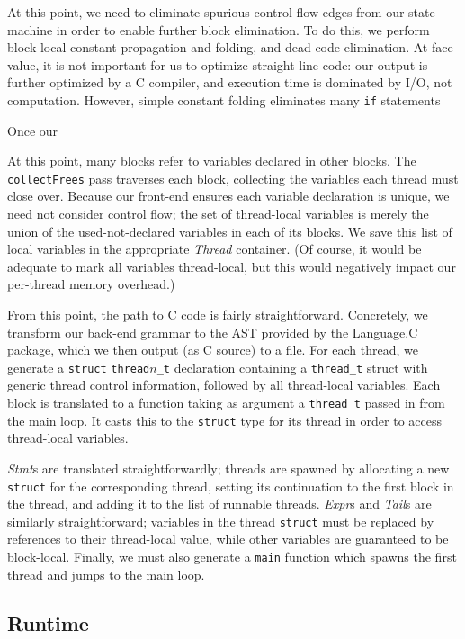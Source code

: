 \documentclass[preprint]{sigplanconf}
\renewcommand{\t}{\texttt}
\renewcommand{\i}{\textit}
\begin{document}
At this point, we need to eliminate spurious control flow edges from our state
machine in order to enable further block elimination. To do this, we perform
block-local constant propagation and folding, and dead code elimination. At face
value, it is not important for us to optimize straight-line code: our output is
further optimized by a C compiler, and execution time is dominated by I/O, not
computation. However, simple constant folding eliminates many \t{if} statements

Once our 

At this point, many blocks refer to variables declared in other blocks. The
\t{collectFrees} pass traverses each block, collecting the variables each thread
must close over. Because our front-end ensures each variable declaration is
unique, we need not consider control flow; the set of thread-local variables is
merely the union of the used-not-declared variables in each of its blocks.  We
save this list of local variables in the appropriate \i{Thread} container. (Of
course, it would be adequate to mark all variables thread-local, but this would
negatively impact our per-thread memory overhead.)

From this point, the path to C code is fairly straightforward. Concretely, we
transform our back-end grammar to the AST provided by the Language.C package,
which we then output (as C source) to a file. For each thread, we generate a
\t{struct} \t{thread$n$\_t} declaration containing a \t{thread\_t} struct with
generic thread control information, followed by all thread-local variables. Each
block is translated to a function taking as argument a \t{thread\_t} passed in
from the main loop. It casts this to the \t{struct} type for its thread in order
to access thread-local variables.

\i{Stmt}s are translated straightforwardly; threads are spawned by allocating a
new \t{struct} for the corresponding thread, setting its continuation to the
first block in the thread, and adding it to the list of runnable threads.
\i{Expr}s and \i{Tail}s are similarly straightforward; variables in the thread
\t{struct} must be replaced by references to their thread-local value, while
other variables are guaranteed to be block-local. Finally, we must also generate
a \t{main} function which spawns the first thread and jumps to the main loop.
  
\subsection{Runtime}
\end{document}
